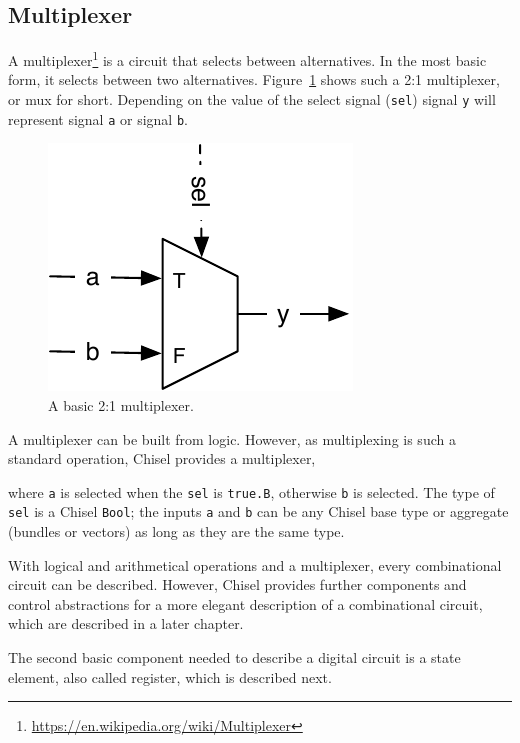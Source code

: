\documentclass[%
    10pt,
    headinclude, footexclude,
    openright, %
    notitlepage,
    cleardoubleempty,
    headsepline,
    pointlessnumbers,
    bibtotoc, idxtotoc,
    ]{scrbook}
\newcommand{\code}[1]{{\small{\texttt{#1}}}}
\newcommand{\scale}{0.7}
\newcommand{\myref}[2]{\href{#1}{#2}}
\renewcommand{\myref}[2]{{#2}{\footnote{\url{#1}}}}
\begin{document}


\subsection{Multiplexer}


A \myref{https://en.wikipedia.org/wiki/Multiplexer}{multiplexer} is a circuit that selects between alternatives.
In the most basic form, it selects between two alternatives. Figure~\ref{fig:mux} shows
such a 2:1 multiplexer, or mux for short. Depending on the value of the
select signal (\code{sel}) signal \code{y} will represent signal \code{a} or
signal \code{b}.

\begin{figure}
  \centering
  \includegraphics[scale=\scale]{figures/mux}
  \caption{A basic 2:1 multiplexer.}
  \label{fig:mux}
\end{figure}

A multiplexer can be built from logic.
However, as multiplexing  is such a standard operation, Chisel provides a multiplexer,


\noindent where \code{a} is selected when the \code{sel} is \code{true.B}, otherwise \code{b}
is selected. The type of \code{sel} is a Chisel \code{Bool}; the inputs \code{a} and \code{b}
can be any Chisel base type or aggregate (bundles or vectors) as long as they are the same
type.

With logical and arithmetical operations and a multiplexer, every combinational
circuit can be described. However, Chisel provides further components and control abstractions
for a more elegant description of a combinational circuit, which are described in
a later chapter.

The second basic component needed to describe a digital circuit is a state element,
also called register, which is described next.
\end{document}
